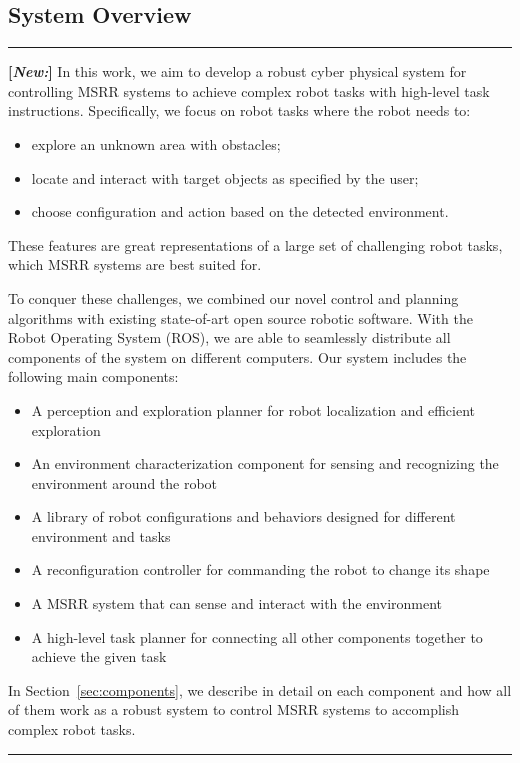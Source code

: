 \documentclass[conference]{IEEEtran}
\newcommand{\separator}{ \noindent \rule{\columnwidth}{1pt} }
\newenvironment{new}{\color{Blue} \separator \textbf{[\textit{New:}]} }{\ignorespacesafterend \separator}
\begin{document}
\subsection{System Overview}
%
%
\begin{new}
In this work, we aim to develop a robust cyber physical system for controlling MSRR systems to achieve complex robot tasks with high-level task instructions.
Specifically, we focus on robot tasks where the robot needs to:
\begin{itemize}
\item explore an unknown area with obstacles;
\item locate and interact with target objects as specified by the user;
\item choose configuration and action based on the detected environment.
\end{itemize}
These features are great representations of a large set of challenging robot tasks, which MSRR systems are best suited for.

To conquer these challenges, we combined our novel control and planning algorithms with existing state-of-art open source robotic software.
With the Robot Operating System (ROS), we are able to seamlessly distribute all components of the system on different computers.
Our system includes the following main components:
\begin{itemize}
\item A perception and exploration planner for robot localization and efficient exploration
\item An environment characterization component for sensing and recognizing the environment around the robot
\item A library of robot configurations and behaviors designed for different environment and tasks
\item A reconfiguration controller for commanding the robot to change its shape
\item A MSRR system that can sense and interact with the environment
\item A high-level task planner for connecting all other components together to achieve the given task
\end{itemize}
In Section~\ref{sec:components}, we describe in detail on each component and how all of them work as a robust system to control MSRR systems to accomplish complex robot tasks.
\end{new}
\end{document}
